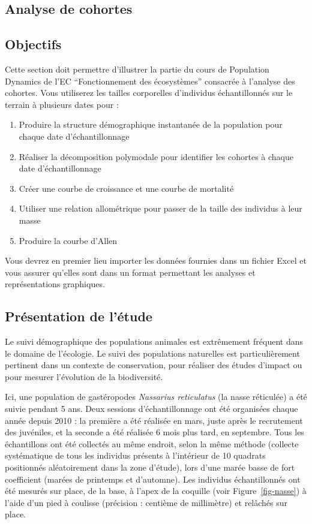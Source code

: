 \documentclass[
  french,
  a4paper,
  DIV=11,
  numbers=noendperiod,
  oneside]{scrreprt}
\providecommand{\tightlist}{%
  \setlength{\itemsep}{0pt}\setlength{\parskip}{0pt}}
\begin{document}
\begin{tcolorbox}

\chapter{Analyse de cohortes}\label{sec-cohortes}

\section{Objectifs}\label{objectifs-2}

Cette section doit permettre d'illustrer la partie du cours de
Population Dynamics de l'EC ``Fonctionnement des écosystèmes'' consacrée
à l'analyse des cohortes. Vous utiliserez les tailles corporelles
d'individus échantillonnés sur le terrain à plusieurs dates pour :

\begin{enumerate}
\def\labelenumi{\arabic{enumi}.}
\tightlist
\item
  Produire la structure démographique instantanée de la population pour
  chaque date d'échantillonnage
\item
  Réaliser la décomposition polymodale pour identifier les cohortes à
  chaque date d'échantillonnage
\item
  Créer une courbe de croissance et une courbe de mortalité
\item
  Utiliser une relation allométrique pour passer de la taille des
  individus à leur masse
\item
  Produire la courbe d'Allen
\end{enumerate}

Vous devrez en premier lieu importer les données fournies dans un
fichier Excel et vous assurer qu'elles sont dans un format permettant
les analyses et représentations graphiques.

\section{Présentation de l'étude}\label{sec-pres}

Le suivi démographique des populations animales est extrêmement fréquent
dans le domaine de l'écologie. Le suivi des populations naturelles est
particulièrement pertinent dans un contexte de conservation, pour
réaliser des études d'impact ou pour mesurer l'évolution de la
biodiversité.

Ici, une population de gastéropodes \emph{Nassarius reticulatus} (la
nasse réticulée) a été suivie pendant 5 ans. Deux sessions
d'échantillonnage ont été organisées chaque année depuis 2010 : la
première a été réalisée en mars, juste après le recrutement des
juvéniles, et la seconde a été réalisée 6 mois plus tard, en septembre.
Tous les échantillons ont été collectés au même endroit, selon la même
méthode (collecte systématique de tous les individus présents à
l'intérieur de 10 quadrats positionnés aléatoirement dans la zone
d'étude), lors d'une marée basse de fort coefficient (marées de
printemps et d'automne). Les individus échantillonnés ont été mesurés
sur place, de la base, à l'apex de la coquille (voir
Figure~\ref{fig-nasse}) à l'aide d'un pied à coulisse (précision :
centième de millimètre) et relâchés sur place.


\end{tcolorbox}
\end{document}
